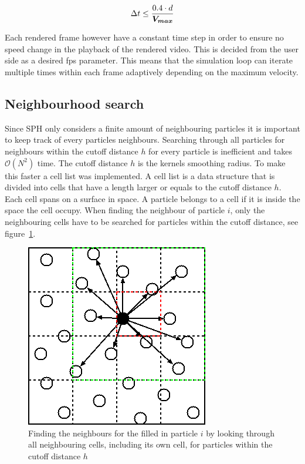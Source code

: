 \begin{equation}\label{eq:cfl}
\Delta t \leq \frac{0.4 \cdot d}{\bm{V_{max}}}
\end{equation}

Each rendered frame however have a constant time step in order to ensure no speed change in the playback of the rendered video. 
This is decided from the user side as a desired fps parameter. 
This means that the simulation loop can iterate multiple times within each frame adaptively depending on the maximum velocity.


\subsection{Neighbourhood search} \label{section:neighbour}
    Since SPH only considers a finite amount of neighbouring particles it is important to keep track of every particles neighbours.
    Searching through all particles for neighbours within the cutoff distance $h$ for every particle is inefficient and takes $\mathcal{O}({N^2})$ time.
    The cutoff distance $h$ is the kernels smoothing radius.
    To make this faster a cell list was implemented.
    A cell list is a data structure that is divided into cells that have a length larger or equals to the cutoff distance $h$.
    Each cell spans on a surface in space.
    A particle belongs to a cell if it is inside the space the cell occupy.
    When finding the neighbour of particle $i$, only the neighbouring cells have to be searched for particles within the cutoff distance, see figure~\ref{fig:cellList}.
    
    \begin{figure}[h!]\centering
    \begin{centering}
    \includegraphics[width=0.7\linewidth]{img/CellList.png}
    \caption{Finding the neighbours for the filled in particle $i$ by looking through all neighbouring cells, including its own cell, for particles within the cutoff distance $h$}
    \label{fig:cellList}
    \end{centering}
    \end{figure}

